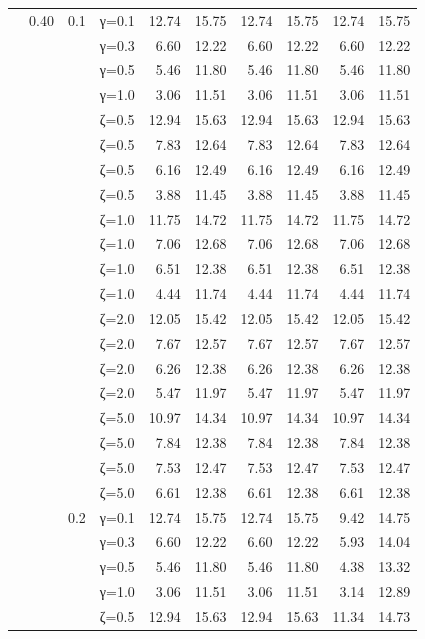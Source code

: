 \begin{table}[htbp]
\begin{tabular}{ll r l  rr  rr  rr}
  & 0.40 & 0.1 & γ=0.1 & 12.74 & 15.75 & 12.74 & 15.75 & 12.74 & 15.75 \\
  &  &  & γ=0.3 & 6.60 & 12.22 & 6.60 & 12.22 & 6.60 & 12.22 \\
  &  &  & γ=0.5 & 5.46 & 11.80 & 5.46 & 11.80 & 5.46 & 11.80 \\
  &  &  & γ=1.0 & 3.06 & 11.51 & 3.06 & 11.51 & 3.06 & 11.51 \\
  &  &  & ζ=0.5 & 12.94 & 15.63 & 12.94 & 15.63 & 12.94 & 15.63 \\
  &  &  & ζ=0.5 & 7.83 & 12.64 & 7.83 & 12.64 & 7.83 & 12.64 \\
  &  &  & ζ=0.5 & 6.16 & 12.49 & 6.16 & 12.49 & 6.16 & 12.49 \\
  &  &  & ζ=0.5 & 3.88 & 11.45 & 3.88 & 11.45 & 3.88 & 11.45 \\
  &  &  & ζ=1.0 & 11.75 & 14.72 & 11.75 & 14.72 & 11.75 & 14.72 \\
  &  &  & ζ=1.0 & 7.06 & 12.68 & 7.06 & 12.68 & 7.06 & 12.68 \\
  &  &  & ζ=1.0 & 6.51 & 12.38 & 6.51 & 12.38 & 6.51 & 12.38 \\
  &  &  & ζ=1.0 & 4.44 & 11.74 & 4.44 & 11.74 & 4.44 & 11.74 \\
  &  &  & ζ=2.0 & 12.05 & 15.42 & 12.05 & 15.42 & 12.05 & 15.42 \\
  &  &  & ζ=2.0 & 7.67 & 12.57 & 7.67 & 12.57 & 7.67 & 12.57 \\
  &  &  & ζ=2.0 & 6.26 & 12.38 & 6.26 & 12.38 & 6.26 & 12.38 \\
  &  &  & ζ=2.0 & 5.47 & 11.97 & 5.47 & 11.97 & 5.47 & 11.97 \\
  &  &  & ζ=5.0 & 10.97 & 14.34 & 10.97 & 14.34 & 10.97 & 14.34 \\
  &  &  & ζ=5.0 & 7.84 & 12.38 & 7.84 & 12.38 & 7.84 & 12.38 \\
  &  &  & ζ=5.0 & 7.53 & 12.47 & 7.53 & 12.47 & 7.53 & 12.47 \\
  &  &  & ζ=5.0 & 6.61 & 12.38 & 6.61 & 12.38 & 6.61 & 12.38 \\
  &  & 0.2 & γ=0.1 & 12.74 & 15.75 & 12.74 & 15.75 & 9.42 & 14.75 \\
  &  &  & γ=0.3 & 6.60 & 12.22 & 6.60 & 12.22 & 5.93 & 14.04 \\
  &  &  & γ=0.5 & 5.46 & 11.80 & 5.46 & 11.80 & 4.38 & 13.32 \\
  &  &  & γ=1.0 & 3.06 & 11.51 & 3.06 & 11.51 & 3.14 & 12.89 \\
  &  &  & ζ=0.5 & 12.94 & 15.63 & 12.94 & 15.63 & 11.34 & 14.73 \\

\end{tabular}
\end{table}
